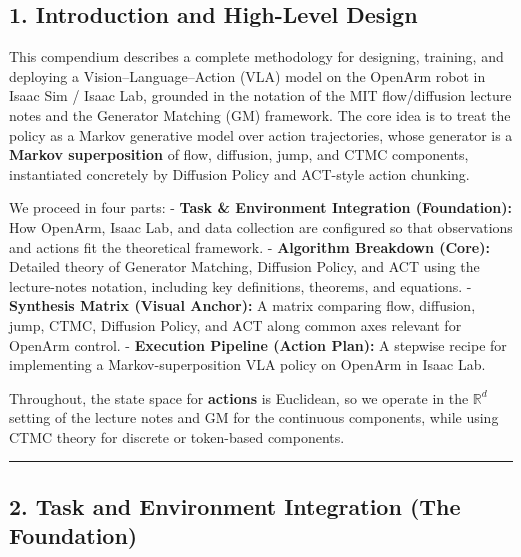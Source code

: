 \documentclass[
]{article}
\theoremstyle{remark}
\begin{document}
\subsection{1. Introduction and High-Level
Design}\label{introduction-and-high-level-design}

This compendium describes a complete methodology for designing,
training, and deploying a Vision--Language--Action (VLA) model on the
OpenArm robot in Isaac Sim / Isaac Lab, grounded in the notation of the
MIT flow/diffusion lecture notes and the Generator Matching (GM)
framework. The core idea is to treat the policy as a Markov generative
model over action trajectories, whose generator is a \textbf{Markov
superposition} of flow, diffusion, jump, and CTMC components,
instantiated concretely by Diffusion Policy and ACT-style action
chunking. \cite{lecnotes2026,diffpolicy-theory-notes,gm-companion-notes,gm2025,diffusion-policy2023,act-project-page}

We proceed in four parts: - \textbf{Task \& Environment Integration
(Foundation):} How OpenArm, Isaac Lab, and data collection are
configured so that observations and actions fit the theoretical
framework. \cite{act-openarm-notes,isaaclab-github} - \textbf{Algorithm Breakdown (Core):}
Detailed theory of Generator Matching, Diffusion Policy, and ACT using
the lecture-notes notation, including key definitions, theorems, and
equations. \cite{diffpolicy-theory-notes,gm-companion-notes,gm2025,diffusion-policy2023,act-hf-summary,lecnotes2026}
- \textbf{Synthesis Matrix (Visual Anchor):} A matrix comparing flow,
diffusion, jump, CTMC, Diffusion Policy, and ACT along common axes
relevant for OpenArm control. - \textbf{Execution Pipeline (Action
Plan):} A stepwise recipe for implementing a Markov-superposition VLA
policy on OpenArm in Isaac Lab.

Throughout, the state space for \textbf{actions} is Euclidean, so we
operate in the \(\mathbb{R}^d\) setting of the lecture notes and GM for
the continuous components, while using CTMC theory for discrete or
token-based components. \cite{gm-companion-notes,gm2025,lecnotes2026}

\begin{center}\rule{0.5\linewidth}{0.5pt}\end{center}

\subsection{2. Task and Environment Integration (The
Foundation)}\label{task-and-environment-integration-the-foundation}
\end{document}
